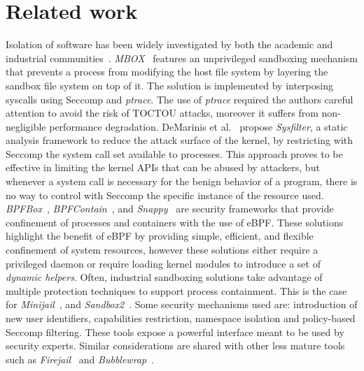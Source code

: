 \section{Related work}
\label{natisand:rel_works}

Isolation of software has been widely investigated by both the academic
and industrial communities~\cite{berman1995tron, kim2013practical,
  demarinis2020sysfilter, minijail, sandbox2, firejail,
  bubblewrap,seapp,enhance-wasm-sandbox}.  {\em MBOX}~\cite{
  kim2013practical} features an unprivileged sandboxing mechanism that
prevents a process from modifying the host file system by layering the
sandbox file system on top of it. The solution is implemented by
interposing syscalls using Seccomp and {\em ptrace}. The use of {\em
  ptrace} required the authors careful attention to avoid the risk of
TOCTOU attacks, moreover it suffers from non-negligible performance
degradation. DeMarinis et al.~\cite{demarinis2020sysfilter} propose
{\em Sysfilter}, a static analysis framework to reduce the attack
surface of the kernel, by restricting with Seccomp the system call set
available to processes.  This approach proves to be effective in
limiting the kernel APIs that can be abused by attackers, but whenever
a system call is necessary for the benign behavior of a program, there
is no way to control with Seccomp the specific instance of the
resource used. {\em BPFBox}~\cite{ findlay2020bpfbox}, {\em
  BPFContain}~\cite{findlay2021bpfcontain}, and {\em
  Snappy}~\cite{belair2021snappy} are security frameworks that provide
confinement of processes and containers with the use of eBPF.  These
solutions highlight the benefit of eBPF by providing simple, efficient,
and flexible confinement of system resources, however these solutions
either require a privileged daemon or require loading kernel modules
to introduce a set of {\em dynamic helpers}.   Often,
industrial sandboxing solutions take advantage of multiple protection
techniques to support process containment. This is the case for {\em
  Minijail}~\cite{minijail}, and {\em Sandbox2}~\cite{ sandbox2}. Some
security mechanisms used are: introduction of new user identifiers,
capabilities restriction, namespace isolation and policy-based Seccomp
filtering. These tools expose a powerful interface meant
to be used by security experts. Similar considerations are shared with
other less mature tools such as {\em Firejail}~\cite{ firejail} and
{\em Bubblewrap}~\cite{bubblewrap}.

